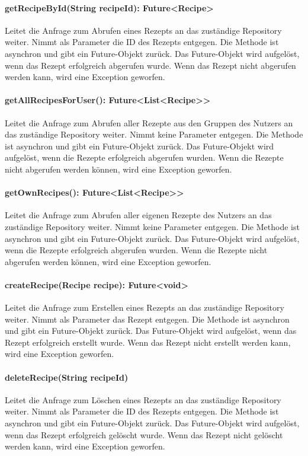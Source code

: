 \documentclass[parskip=full]{scrartcl}
\begin{document}
\paragraph{getRecipeById(String recipeId): Future<Recipe>}
Leitet die Anfrage zum Abrufen eines Rezepts an das zuständige Repository weiter. Nimmt als Parameter die ID des Rezepts entgegen. Die Methode ist asynchron und gibt ein Future-Objekt zurück. Das Future-Objekt wird aufgelöst, wenn das Rezept erfolgreich abgerufen wurde. Wenn das Rezept nicht abgerufen werden kann, wird eine Exception geworfen.
\paragraph{getAllRecipesForUser(): Future<List<Recipe>>}
Leitet die Anfrage zum Abrufen aller Rezepte aus den Gruppen des Nutzers an das zuständige Repository weiter. Nimmt keine Parameter entgegen. Die Methode ist asynchron und gibt ein Future-Objekt zurück. Das Future-Objekt wird aufgelöst, wenn die Rezepte erfolgreich abgerufen wurden. Wenn die Rezepte nicht abgerufen werden können, wird eine Exception geworfen.
\paragraph{getOwnRecipes(): Future<List<Recipe>>}
Leitet die Anfrage zum Abrufen aller eigenen Rezepte des Nutzers an das zuständige Repository weiter. Nimmt keine Parameter entgegen. Die Methode ist asynchron und gibt ein Future-Objekt zurück. Das Future-Objekt wird aufgelöst, wenn die Rezepte erfolgreich abgerufen wurden. Wenn die Rezepte nicht abgerufen werden können, wird eine Exception geworfen.
\paragraph{createRecipe(Recipe recipe): Future<void>}
Leitet die Anfrage zum Erstellen eines Rezepts an das zuständige Repository weiter. Nimmt als Parameter das Rezept entgegen. Die Methode ist asynchron und gibt ein Future-Objekt zurück. Das Future-Objekt wird aufgelöst, wenn das Rezept erfolgreich erstellt wurde. Wenn das Rezept nicht erstellt werden kann, wird eine Exception geworfen.
\paragraph{deleteRecipe(String recipeId)}
Leitet die Anfrage zum Löschen eines Rezepts an das zuständige Repository weiter. Nimmt als Parameter die ID des Rezepts entgegen. Die Methode ist asynchron und gibt ein Future-Objekt zurück. Das Future-Objekt wird aufgelöst, wenn das Rezept erfolgreich gelöscht wurde. Wenn das Rezept nicht gelöscht werden kann, wird eine Exception geworfen.
\end{document}
